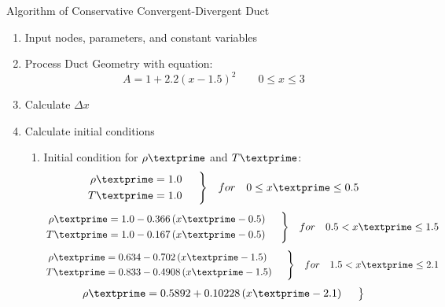 \documentclass[12pt]{article}
\newenvironment{rcases}
	{\left.\begin{aligned}}
	{\end{aligned}\hspace{1.5em}\right\rbrace}
\begin{document}
{\huge \centering Algorithm of Conservative Convergent-Divergent Duct}

\begin{enumerate}
	\item Input nodes, parameters, and constant variables
	\item Process Duct Geometry with equation:
		\begin{equation}
			A = 1 + 2.2\left(x - 1.5\right)^{2}\hspace{2em}0\leq x \leq 3
		\end{equation}
	\item Calculate $\Delta x$
	\item Calculate initial conditions 
	\begin{enumerate}
		\item Initial condition for $\rho\textprime$ and $T\textprime$:
			\begin{equation}
				\begin{rcases}
					\rho\textprime	&= 1.0 \\
					T\textprime	&= 1.0
				\end{rcases}
				\hspace{1em}for\hspace{1em}0\leq x\textprime \leq 0.5
			\end{equation}
			\begin{equation}
				\begin{rcases}
					\rho\textprime	&= 1.0 - 0.366\left(x\textprime - 0.5\right)\\
					T\textprime	&= 1.0 - 0.167\left(x\textprime - 0.5\right)
				\end{rcases}
				\hspace{1em}for\hspace{1em}0.5 < x\textprime \leq 1.5
			\end{equation}
			\begin{equation}
				\begin{rcases}
					\rho\textprime	&= 0.634 - 0.702\left(x\textprime - 1.5\right)\\
					T\textprime	&= 0.833 - 0.4908\left(x\textprime - 1.5\right)
				\end{rcases}
				\hspace{1em}for\hspace{1em}1.5 < x\textprime \leq 2.1
			\end{equation}
			\begin{equation}
				\begin{rcases}
					\rho\textprime	&= 0.5892 + 0.10228\left(x\textprime - 2.1\right)\\

\end{rcases}
\end{equation}
\end{enumerate}
\end{enumerate}
\end{document}

